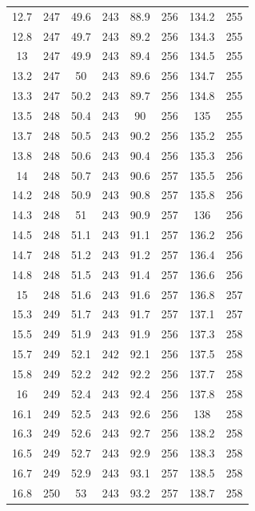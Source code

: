 \documentclass[12pt]{ctexart}
\numberwithin{equation}{section}
\begin{document}
\begin{longtable}{cc|cc|cc|cc}
12.7  &  247  &  49.6  &  243  &  88.9  &  256  &  134.2  &  255  \\
12.8  &  247  &  49.7  &  243  &  89.2  &  256  &  134.3  &  255  \\
13  &  247  &  49.9  &  243  &  89.4  &  256  &  134.5  &  255  \\
13.2  &  247  &  50  &  243  &  89.6  &  256  &  134.7  &  255  \\
13.3  &  247  &  50.2  &  243  &  89.7  &  256  &  134.8  &  255  \\
13.5  &  248  &  50.4  &  243  &  90  &  256  &  135  &  255  \\
13.7  &  248  &  50.5  &  243  &  90.2  &  256  &  135.2  &  255  \\
13.8  &  248  &  50.6  &  243  &  90.4  &  256  &  135.3  &  256  \\
14  &  248  &  50.7  &  243  &  90.6  &  257  &  135.5  &  256  \\
14.2  &  248  &  50.9  &  243  &  90.8  &  257  &  135.8  &  256  \\
14.3  &  248  &  51  &  243  &  90.9  &  257  &  136  &  256  \\
14.5  &  248  &  51.1  &  243  &  91.1  &  257  &  136.2  &  256  \\
14.7  &  248  &  51.2  &  243  &  91.2  &  257  &  136.4  &  256  \\
14.8  &  248  &  51.5  &  243  &  91.4  &  257  &  136.6  &  256  \\
15  &  248  &  51.6  &  243  &  91.6  &  257  &  136.8  &  257  \\
15.3  &  249  &  51.7  &  243  &  91.7  &  257  &  137.1  &  257  \\
15.5  &  249  &  51.9  &  243  &  91.9  &  256  &  137.3  &  258  \\
15.7  &  249  &  52.1  &  242  &  92.1  &  256  &  137.5  &  258  \\
15.8  &  249  &  52.2  &  242  &  92.2  &  256  &  137.7  &  258  \\
16  &  249  &  52.4  &  243  &  92.4  &  256  &  137.8  &  258  \\
16.1  &  249  &  52.5  &  243  &  92.6  &  256  &  138  &  258  \\
16.3  &  249  &  52.6  &  243  &  92.7  &  256  &  138.2  &  258  \\
16.5  &  249  &  52.7  &  243  &  92.9  &  256  &  138.3  &  258  \\
16.7  &  249  &  52.9  &  243  &  93.1  &  257  &  138.5  &  258  \\
16.8  &  250  &  53  &  243  &  93.2  &  257  &  138.7  &  258  \\

\end{longtable}
\end{document}
